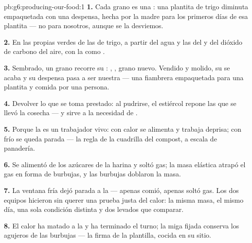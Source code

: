 \begin{solution}{pb:g6:producing-our-food:1}
\textbf{1.} Cada grano es una : una plantita de trigo diminuta
empaquetada con una despensa, hecha por la madre para los primeros días
de esa plantita --- no para nosotros, aunque se la desviemos.

\textbf{2.} En las propias  verdes de las  de trigo, a
partir del agua y las  del  y del dióxido de
carbono del aire, con la  como .

\textbf{3.} Sembrado, un grano recorre su : ,
, grano nuevo. Vendido y molido, su  se acaba y su
despensa pasa a ser nuestra --- una fiambrera empaquetada para una
plantita y comida por una persona.

\textbf{4.} Devolver lo que se toma prestado: al pudrirse, el estiércol
repone las  que se llevó la cosecha --- y sirve a la
necesidad de .

\textbf{5.} Porque la  es un trabajador vivo: con calor se
alimenta y trabaja deprisa; con frío se queda parada --- la regla de la
cuadrilla del compost, a escala de panadería.

\textbf{6.} Se alimentó de los azúcares de la harina y soltó gas; la
masa elástica atrapó el gas en forma de burbujas, y las burbujas
doblaron la masa.

\textbf{7.} La ventana fría dejó parada a la  --- apenas comió,
apenas soltó gas. Los dos equipos hicieron sin querer una prueba justa
del calor: la misma masa, el mismo día, una sola condición distinta y
dos levados que comparar.

\textbf{8.} El calor ha matado a la  y ha terminado el turno;
la miga fijada conserva los agujeros de las burbujas --- la firma de la
plantilla, cocida en su sitio.


\end{solution}
